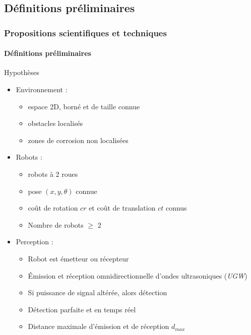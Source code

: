 \documentclass{beamer}
\begin{document}
		\subsection{Définitions préliminaires}
			\begin{frame}[shrink=5]
				\frametitle{Propositions scientifiques et techniques}
				\framesubtitle{Définitions préliminaires}
				\begin{block}{Hypothèses}
					\begin{itemize}
						\item Environnement :
						\begin{itemize}
							\item espace 2D, borné et de taille connue
							\item obstacles localisés
							\item zones de corrosion non localisées
						\end{itemize}
						\item Robots :
						\begin{itemize}
							\item robots à 2 roues
							\item pose $(x, y, \theta)$ connue
							\item coût de rotation $cr$ et coût de translation $ct$ connus
							\item Nombre de robots $\ge$ 2
						\end{itemize}
						\item Perception :
						\begin{itemize}
							\item Robot est émetteur ou récepteur
							\item Émission et réception omnidirectionnelle d'ondes ultrasoniques (\textit{UGW})
							\item Si puissance de signal altérée, alors détection
							\item Détection parfaite et en temps réel
							\item Distance maximale d'émission et de réception $d_{max}$
						\end{itemize}
					\end{itemize}
				\end{block}
			\end{frame}
\end{document}
